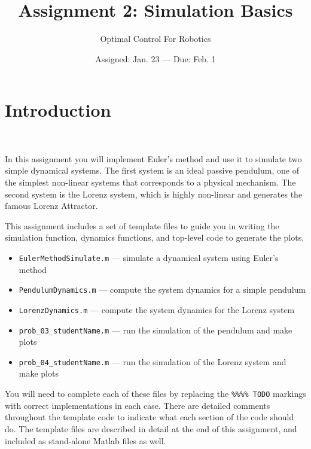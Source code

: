 

\title{Assignment 2:  Simulation Basics}
\date{Assigned:  Jan. 23  ---  Due:  Feb. 1}
\author{Optimal Control For Robotics}

\maketitle

\section*{Introduction}\

In this assignment you will implement Euler's method and
use it to simulate two simple dynamical systems.
The first system is an ideal passive pendulum,
one of the simplest non-linear systems that corresponds to a physical mechanism.
The second system is the Lorenz system,
which is highly non-linear and generates the famous Lorenz Attractor.

\par This assignment includes a set of template files to guide you in writing the
simulation function, dynamics functions, and top-level code to generate the plots.
\vspace{-0.6em} \begin{itemize}  \setlength\itemsep{0em}
  \item \texttt{EulerMethodSimulate.m} --- simulate a dynamical system using Euler's method
  \item \texttt{PendulumDynamics.m} --- compute the system dynamics for a simple pendulum
  \item \texttt{LorenzDynamics.m} --- compute the system dynamics for the Lorenz system
  \item \texttt{prob\_03\_studentName.m} --- run the simulation of the pendulum and make plots
  \item \texttt{prob\_04\_studentName.m} --- run the simulation of the Lorenz system and make plots
\end{itemize}

You will need to complete each of these files by replacing the \texttt{\%\%\%\% TODO} markings with
correct implementations in each case. There are detailed comments throughout the template code
to indicate what each section of the code should do. The template files are described in
detail at the end of this assignment, and included as stand-alone Matlab files as well.

